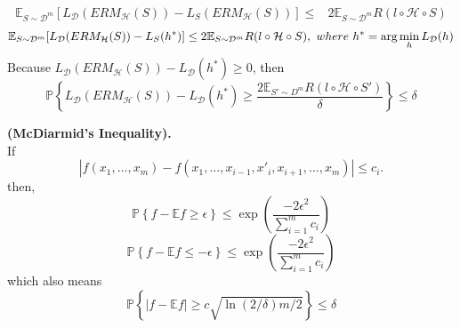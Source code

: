 \begin{theorem}
    \begin{align*}
        \mathbb{E} _{S \sim \mathcal{D}^m}[L_ \mathcal{D}(ERM_ \mathcal{H}(S)) - L_S(ERM_ \mathcal{H}(S))]
        \le& 2 \mathbb{E}_{S \sim \mathcal{D}^m } R( l \circ \mathcal{H} \circ S)
    \end{align*}
    \[
        \mathbb{E} _{S \sim \mathcal{D}^m}[L_ \mathcal{D}(ERM_ \mathcal{H}(S)) - L_S(h^*)]
        \le 2 \mathbb{E}_{S \sim \mathcal{D}^m } R( l \circ \mathcal{H} \circ S),
        \ where\ h^* = \arg\min_h L_\mathcal{D}(h)\\
    \]
    Because $ L_ \mathcal{D}(ERM_ \mathcal{H}(S)) - L_ \mathcal{D}(h^*) \ge 0 $, then
    \[
        \mathbb{P} \left\{ L_ \mathcal{D}(ERM_ \mathcal{H}(S)) - L_ \mathcal{D}(h^*) \ge 
        \frac{2 \mathbb{E}_{S' \sim D^m} R(l \circ \mathcal{H} \circ S')}{\delta} \right\} \le \delta
    \]
\end{theorem}
\begin{lemma}
    \textbf{(McDiarmid's Inequality).}\\
    If
    \[
        \left| f(x_1, \ldots, x_m) - f(x_1, \ldots, x_{i-1}, x'_i, x_{i+1}, \ldots, x_m) \right| \le c_i.
    \]
    then,
    \[
        \mathbb{P} \left\{ f - \mathbb{E}f \ge \epsilon  \right\} \le \exp \left( \frac{-2\epsilon^2}{ \sum^{m}_{i=1} c_i}  \right)
    \]
    \[
        \mathbb{P} \left\{ f - \mathbb{E}f \le -\epsilon  \right\} \le \exp \left( \frac{-2\epsilon^2}{ \sum^{m}_{i=1} c_i}  \right)
    \]
    which also means
    \[
        \mathbb{P} \left\{ | f - \mathbb{E}f | \ge c \sqrt{\ln( 2/\delta ) m/2}  \right\} \le \delta
    \]
\end{lemma}

